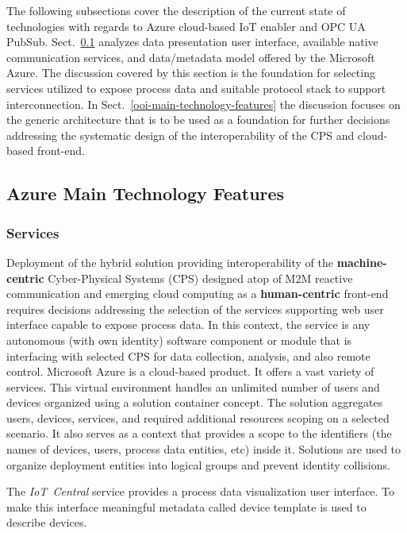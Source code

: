 \documentclass{article}
\begin{document}
The following subsections cover the description of the current state of technologies with regards to Azure cloud-based IoT enabler and OPC UA PubSub. Sect.~\ref*{azure-main-technology-features} analyzes data presentation user interface, available native communication services, and data/metadata model offered by the Microsoft Azure. The discussion covered by this section is the foundation for selecting services utilized to expose process data and suitable protocol stack to support interconnection. In Sect.~\ref*{ooi-main-technology-features} the discussion focuses on the generic architecture that is to be used as a foundation for further decisions addressing the systematic design of the interoperability of the CPS and cloud-based front-end.

\subsection{Azure Main Technology Features}\label{azure-main-technology-features}

\subsubsection{Services}\label{services}

Deployment of the hybrid solution providing interoperability of the \textbf{machine-centric} Cyber-Physical Systems (CPS) designed atop of M2M reactive communication and emerging cloud computing as a \textbf{human-centric} front-end requires decisions addressing the selection of the services supporting web user interface capable to expose process data. In this context, the service is any autonomous (with own identity) software component or module that is interfacing with selected CPS for data collection, analysis, and also remote control. Microsoft Azure is a cloud-based product. It offers a vast variety of services. This virtual environment handles an unlimited number of users and devices organized using a solution container concept. The solution aggregates users, devices, services, and required additional resources scoping on a selected scenario. It also serves as a context that provides a scope to the identifiers (the names of devices, users, process data entities, etc) inside it. Solutions are used to organize deployment entities into logical groups and prevent identity collisions.

The \textit{IoT\ Central} service provides a process data visualization
user interface. To make this interface meaningful metadata called device
template is used to describe devices.
\end{document}
